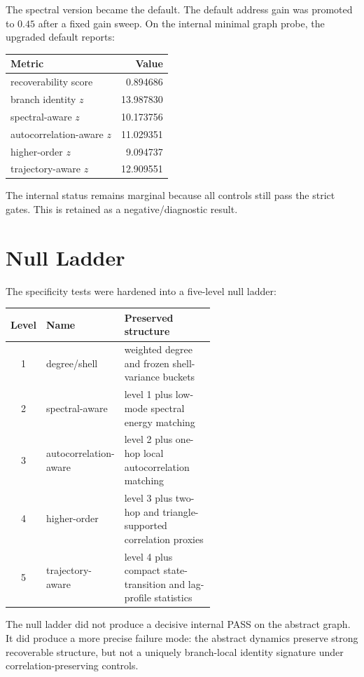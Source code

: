 \documentclass[11pt]{article}
\begin{document}
The spectral version became the default. The default address gain was promoted to $0.45$ after a fixed gain sweep. On the internal minimal graph probe, the upgraded default reports:
\begin{center}
\begin{tabular}{lr}
\toprule
Metric & Value \\
\midrule
recoverability score & 0.894686 \\
branch identity $z$ & 13.987830 \\
spectral-aware $z$ & 10.173756 \\
autocorrelation-aware $z$ & 11.029351 \\
higher-order $z$ & 9.094737 \\
trajectory-aware $z$ & 12.909551 \\
\bottomrule
\end{tabular}
\end{center}

The internal status remains marginal because all controls still pass the strict gates. This is retained as a negative/diagnostic result.

\section{Null Ladder}

The specificity tests were hardened into a five-level null ladder:
\begin{center}
\begin{tabular}{clp{0.58\linewidth}}
\toprule
Level & Name & Preserved structure \\
\midrule
1 & degree/shell & weighted degree and frozen shell-variance buckets \\
2 & spectral-aware & level 1 plus low-mode spectral energy matching \\
3 & autocorrelation-aware & level 2 plus one-hop local autocorrelation matching \\
4 & higher-order & level 3 plus two-hop and triangle-supported correlation proxies \\
5 & trajectory-aware & level 4 plus compact state-transition and lag-profile statistics \\
\bottomrule
\end{tabular}
\end{center}

The null ladder did not produce a decisive internal PASS on the abstract graph. It did produce a more precise failure mode: the abstract dynamics preserve strong recoverable structure, but not a uniquely branch-local identity signature under correlation-preserving controls.
\end{document}

